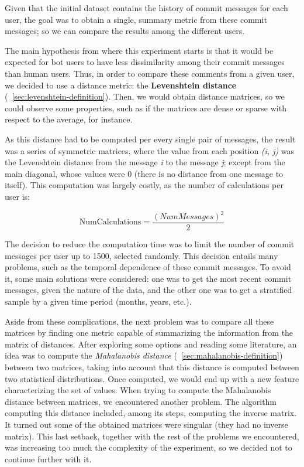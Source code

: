 \documentclass[a4paper, 12pt]{book}
\begin{document}
Given that the initial dataset contains the history of commit messages for each user, the goal was to obtain a single, summary metric from these commit messages; so we can compare the results among the different users.

The main hypothesis from where this experiment starts is that it would be expected for bot users to have less dissimilarity among their commit messages than human users. Thus, in order to compare these comments from a given user, we decided to use a distance metric: the \textbf{Levenshtein distance} (~\ref{sec:levenshtein-definition}). Then, we would obtain distance matrices, so we could observe some properties, such as if the matrices are dense or sparse with respect to the average, for instance.

As this distance had to be computed per every single pair of messages, the result was a series of symmetric matrices, where the value from each position \textit{(i, j)} was the Levenshtein distance from the message \textit{i} to the message \textit{j}; except from the main diagonal, whose values were 0 (there is no distance from one message to itself). This computation was largely costly, as the number of calculations per user is:

\begin{center}
    \begin{equation}
    \mathrm{NumCalculations} = \frac{( NumMessages )^2}{2}
    \end{equation}
\end{center}

The decision to reduce the computation time was to limit the number of commit messages per user up to 1500, selected randomly. This decision entails many problems, such as the temporal dependence of these commit messages. To avoid it, some main solutions were considered: one was to get the most recent commit messages, given the nature of the data, and the other one was to get a stratified sample by a given time period (months, years, etc.).

Aside from these complications, the next problem was to compare all these matrices by finding one metric capable of summarizing the information from the matrix of distances. After exploring some options and reading some literature, an idea was to compute the \textit{Mahalanobis distance} (~\ref{sec:mahalanobis-definition}) between two matrices, taking into account that this distance is computed between two statistical distributions. Once computed, we would end up with a new feature characterizing the set of values. When trying to compute the Mahalanobis distance between matrices, we encountered another problem. The algorithm computing this distance included, among its steps, computing the inverse matrix. It turned out some of the obtained matrices were singular (they had no inverse matrix). This last setback, together with the rest of the problems we encountered, was increasing too much the complexity of the experiment, so we decided not to continue further with it.
\end{document}
